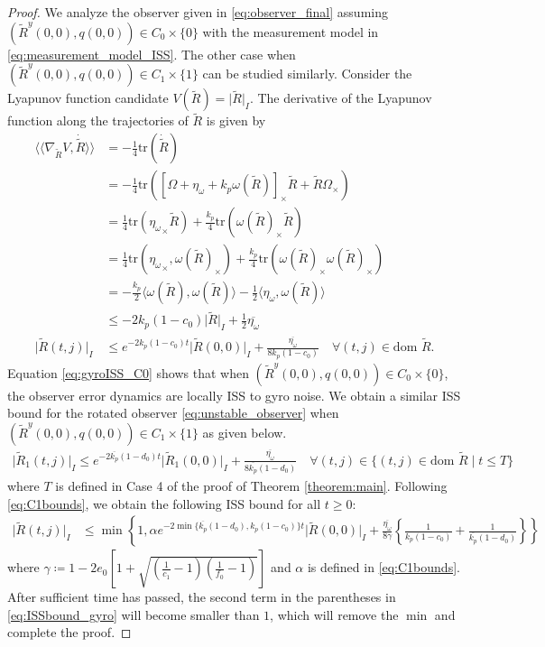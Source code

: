 \documentclass{article}
\newcommand{\dom}{\text{dom }}
\newcommand{\trace}[1]{\text{tr}\left(#1\right)}
\newcommand{\brackets}[1]{\left(#1\right)}
\newcommand{\Rtilde}{\tilde{R}}
\newcommand{\normSOthree}[1]{{{\vert}#1 {\vert}_I}}
\newcommand{\cross}[1]{{#1}_\times}
\newcommand{\expo}[1]{e^{#1}}
\newcommand{\inprod}[2]{\langle #1, #2 \rangle}
\newcommand{\noisegyro}{\eta_\omega}
\newcommand{\maxnoisegyro}{\overline{\eta_\omega}}
\newcommand{\dualpairing}[2]{\langle\langle #1 , #2 \rangle\rangle}
\newcommand{\grad}[2]{\nabla_{#1}{#2}}
\begin{document}
\begin{proof}
We analyze the observer given in \eqref{eq:observer_final} assuming ${(\Rtilde^y(0,0), q(0,0))}\in C_0\times\{0\}$ with the measurement model in \eqref{eq:measurement_model_ISS}. The other case when ${(\Rtilde^y(0,0), q(0,0))}\in C_1\times\{1\}$ can be studied similarly. Consider the Lyapunov function candidate $V(\Rtilde) = \normSOthree\Rtilde$. The derivative of the Lyapunov function along the trajectories of $\Rtilde$ is given by
\begin{align}
    \dualpairing{\grad{\Rtilde}{V}}{\dot\Rtilde} &= -\frac{1}{4}\trace{\dot{\Rtilde}} \nonumber\\
    &= -\frac{1}{4}\trace{\cross{\left[\Omega + \noisegyro + k_p \omega(\Rtilde ) \right]} \Rtilde + \Rtilde\cross{\Omega}} \nonumber\\
    &= \frac{1}{4}\trace{\cross{\noisegyro}\Rtilde} + \frac{k_p}{4}\trace{\cross{\omega(\Rtilde )}\Rtilde} \nonumber\\
    &= \frac{1}{4}\trace{\cross{\noisegyro}, \cross{\omega(\Rtilde)}} + \frac{k_p}{4}\trace{\cross{\omega(\Rtilde)}\cross{\omega(\Rtilde)}}\nonumber \\
    &= -\frac{k_p}{2}\inprod{\omega(\Rtilde)}{\omega(\Rtilde)} - \frac{1}{2}\inprod{\noisegyro}{\omega(\Rtilde)} \nonumber\\
    &\leq -2k_p(1-c_0)\normSOthree{\Rtilde} + \frac{1}{2}\maxnoisegyro \nonumber\\
    \normSOthree{\Rtilde(t,j)} &\leq \expo{-2k_p(1-c_0)t}\normSOthree{\Rtilde(0,0)} + \frac{\maxnoisegyro}{8k_p(1-c_0)} \quad \forall (t,j)\in\dom \Rtilde.\label{eq:gyroISS_C0}
\end{align}
Equation \eqref{eq:gyroISS_C0} shows that when ${(\Rtilde^y(0,0), q(0,0))\in C_0\times\{0\}}$, the observer error dynamics are locally ISS to gyro noise. We obtain a similar ISS bound for the rotated observer \eqref{eq:unstable_observer} when ${(\Rtilde^y(0,0), q(0,0))} \in C_1\times\{1\}$ as given below.
\begin{align}
    \normSOthree{\Rtilde_1(t,j)} \leq \expo{-2\overline{k_p}(1-d_0)t}\normSOthree{\Rtilde_1(0,0)} + \frac{\maxnoisegyro}{8\overline{k_p}(1-d_0)} \quad \forall (t,j)\in\{(t,j)\in\dom \Rtilde \mid t \leq T\} \label{eq:gyroISS_C1}
\end{align}
where $T$ is defined in Case 4 of the proof of Theorem \ref{theorem:main}. Following \eqref{eq:C1bounds}, we obtain the following ISS bound for all $t\geq 0$:
\begin{align}
    \normSOthree{\Rtilde(t,j)}&\leq \min\left\{1, \alpha\expo{-2 \min\{\overline{k_p}(1-d_0), k_p(1-c_0)\} t}\normSOthree{\Rtilde(0,0)} + \frac{\maxnoisegyro}{8\gamma}\left\{\frac{1}{k_p(1-c_0)} + \frac{1}{\overline{k_p}(1-d_0)}\right\}\right\} \label{eq:ISSbound_gyro}
\end{align}
where $\gamma \coloneqq {1 - 2e_0\left[1 + \sqrt{\brackets{\frac{1}{c_1}-1}\brackets{\frac{1}{f_0}-1}}\right]}$ and $\alpha$ is defined in \eqref{eq:C1bounds}. After sufficient time has passed, the second term in the parentheses in \eqref{eq:ISSbound_gyro} will become smaller than $1$, which will remove the $\min$ and complete the proof. 
\end{proof}
\end{document}
